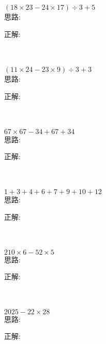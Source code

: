 \item {
    $(18\times 23 - 24\times 17)\div 3 + 5$
    \ifshowSolution
        \fangsong{}
        \\
        思路:

        正解: 
    \else
        \\ \\ \\
    \fi
}

\item {
    $(11\times 24 - 23\times 9)\div 3 + 3$
    \ifshowSolution
        \fangsong{}
        \\
        思路:

        正解: 
    \else
        \\ \\ \\
    \fi
}

\item {
    $67\times 67 - 34 + 67 + 34$
    \ifshowSolution
        \fangsong{}
        \\
        思路:

        正解: 
    \else
        \\ \\ \\
    \fi
}

\item {
    $1+3+4+6+7+9+10 + 12$
    \ifshowSolution
        \fangsong{}
        \\
        思路:

        正解: 
    \else
        \\ \\ \\
    \fi
}

\item {
    $210\times 6 - 52\times 5$
    \ifshowSolution
        \fangsong{}
        \\
        思路:

        正解: 
    \else
        \\ \\ \\
    \fi
}

\item {
    $2025- 22\times 28$  
    \ifshowSolution
        \fangsong{}
        \\
        思路:

        正解: 
    \else
        \\ \\ \\
    \fi
}